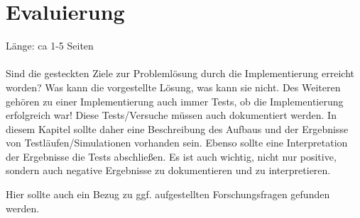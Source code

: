 \chapter{Evaluierung}
Länge: ca 1-5 Seiten\\\\
Sind die gesteckten Ziele zur Problemlösung durch die Implementierung erreicht worden? Was kann die vorgestellte Lösung, was kann sie nicht. Des Weiteren gehören zu einer Implementierung auch immer Tests, ob die Implementierung erfolgreich war! Diese Tests/Versuche müssen auch dokumentiert werden. In diesem Kapitel sollte daher eine Beschreibung des Aufbaus und der Ergebnisse von Testläufen/Simulationen vorhanden sein. Ebenso sollte eine Interpretation der Ergebnisse die Tests abschließen. Es ist auch wichtig, nicht nur positive, sondern auch negative Ergebnisse zu dokumentieren und zu interpretieren.

Hier sollte auch ein Bezug zu ggf. aufgestellten Forschungsfragen gefunden werden.
